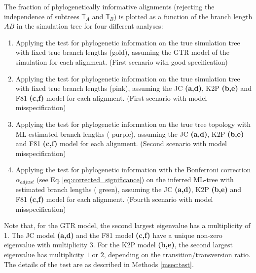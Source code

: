\begin{appendices}
\medskip
The fraction of phylogenetically informative alignments (rejecting the independence of subtrees $\mathbb{T}_A$ and $\mathbb{T}_B$) is plotted as a function of the branch length $AB$ in the simulation tree for four different analyses:

\medskip

\begin{enumerate}
\item  Applying the test for phylogenetic information on the true simulation tree with fixed true branch lengths ({\color{truetreeNoMisspecification}gold}), assuming the GTR model of the simulation for each alignment. (First scenario with good specification)
\item Applying the test for phylogenetic information on the true simulation tree with fixed true branch lengths ({\color{truetree}pink}), assuming the JC \textbf{(a,d)}, K2P \textbf{(b,e)} and F81 \textbf{(c,f)} model for each alignment. (First scenario with model misspecification)
\item Applying the test for phylogenetic information on the true tree topology with ML-estimated branch lengths ({\color{truetreeML} purple}), assuming the JC \textbf{(a,d)}, K2P \textbf{(b,e)} and F81 \textbf{(c,f)} model for each alignment. (Second scenario with model misspecification)
\item Applying the test for phylogenetic information with the  Bonferroni correction $\alpha_{adjust}$ (see Eq.\,\eqref{eq:corrected_significance}) on the inferred ML-tree with estimated branch lengths ({\color{MLtreeBonferroni} green}), assuming the JC \textbf{(a,d)}, K2P \textbf{(b,e)} and F81 \textbf{(c,f)}  model for each alignment. (Fourth scenario with model misspecification) 
\end{enumerate}



\medskip

Note that, for the GTR model, the second largest eigenvalue has a multiplicity of 1. The JC model \textbf{(a,d)} and the F81 model \textbf{(c,f)} have a unique non-zero eigenvalue with multiplicity $3$. For the K2P model \textbf{(b,e)}, the second largest eigenvalue  has multiplicity $1$ or $2$, depending on the transition/transversion ratio. The details of the test are as described in Methods \ref{msec:test}.


\end{appendices}
